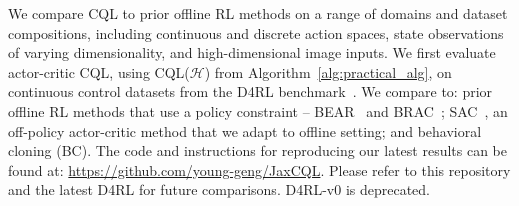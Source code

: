 We compare CQL to prior offline RL methods on a range of domains and dataset compositions, including continuous and discrete action spaces, state observations of varying dimensionality, and high-dimensional image inputs. We first evaluate actor-critic CQL, using CQL($\mathcal{H}$) from Algorithm~\ref{alg:practical_alg}, on continuous control datasets from the D4RL benchmark~\citep{d4rl}.
We compare to: prior offline RL methods that use a policy constraint -- BEAR~\citep{kumar2019stabilizing} and BRAC~\citep{wu2019behavior}; SAC~\citep{haarnoja}, an off-policy actor-critic method that we adapt to offline setting; and behavioral cloning (BC). {The code and instructions for reproducing our latest results can be found at: \url{https://github.com/young-geng/JaxCQL}. Please refer to this repository and the latest D4RL for future comparisons. D4RL-v0 is deprecated.}


